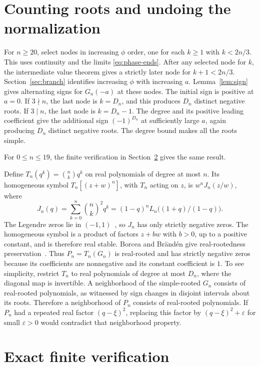 \documentclass[11pt]{article}
\begin{document}
\section{Counting roots and undoing the normalization}\label{sec:count}

For $n\geq20$, select nodes in increasing $\phi$ order, one for each $k\geq1$ with $k<2n/3$. This uses continuity and the limits \eqref{eq:phase-ends}. After any selected node for $k$, the intermediate value theorem gives a strictly later node for $k+1<2n/3$. Section~\ref{sec:branch} identifies increasing $\phi$ with increasing $a$. Lemma~\ref{lem:sign} gives alternating signs for $G_n(-a)$ at these nodes. The initial sign is positive at $a=0$. If $3\nmid n$, the last node is $k=D_n$, and this produces $D_n$ distinct negative roots. If $3\mid n$, the last node is $k=D_n-1$. The degree and its positive leading coefficient give the additional sign $(-1)^{D_n}$ at sufficiently large $a$, again producing $D_n$ distinct negative roots. The degree bound makes all the roots simple.

For \(0\le n\le19\), the finite verification in Section~\ref{sec:finite} gives the same result.

Define $T_n(q^k)=\binom nk q^k$ on real polynomials of degree at most $n$. Its homogeneous symbol $T_n[(z+w)^n]$, with $T_n$ acting on $z$, is $w^nJ_n(z/w)$, where
\[
J_n(q)=\sum_{k=0}^n\binom nk^2q^k=(1-q)^n L_n\big((1+q)/(1-q)\big).
\]
The Legendre zeros lie in $(-1,1)$~\cite[\S18.16(iii)]{dlmf}, so $J_n$ has only strictly negative zeros. The homogeneous symbol is a product of factors $z+bw$ with $b>0$, up to a positive constant, and is therefore real stable. Borcea and Br\"and\'en give real-rootedness preservation~\cite[Theorem~2(b), p.~470]{bb}. Thus $P_n=T_n(G_n)$ is real-rooted and has strictly negative zeros because its coefficients are nonnegative and its constant coefficient is $1$. To see simplicity, restrict $T_n$ to real polynomials of degree at most $D_n$, where the diagonal map is invertible. A neighborhood of the simple-rooted $G_n$ consists of real-rooted polynomials, as witnessed by sign changes in disjoint intervals about its roots. Therefore a neighborhood of $P_n$ consists of real-rooted polynomials. If $P_n$ had a repeated real factor $(q-\xi)^2$, replacing this factor by $(q-\xi)^2+\varepsilon$ for small $\varepsilon>0$ would contradict that neighborhood property.

\section{Exact finite verification}\label{sec:finite}
\end{document}
